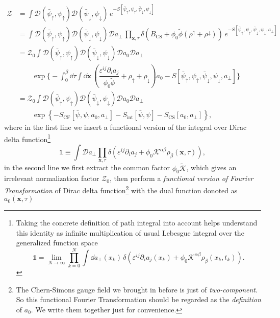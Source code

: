 \documentclass[bachelor,english,numbers]{ustcthesis}
\begin{document}
		\begin{align}
			\mathcal{Z}&=\int \mathcal{D}(\bar{\psi}_\uparrow,\psi_\uparrow)\mathcal{D}(\bar{\psi}_\downarrow,\psi_\downarrow)\,e^{-S[\bar{\psi}_\uparrow,\psi_\uparrow,\bar{\psi}_\downarrow,\psi_\downarrow]}\nonumber\\
			&=\int\mathcal{D}(\bar{\psi}_\uparrow,\psi_\uparrow)\mathcal{D}(\bar{\psi}_\downarrow,\psi_\downarrow)\mathcal{D}a_{\perp}\,\prod_{\bm{x},\tau}\delta\left(B_{\text{CS}}+\phi_0\widetilde{\phi}(\rho^\uparrow+\rho^\downarrow)\right)\,e^{-S[\bar{\psi}_\uparrow,\psi_\uparrow,\bar{\psi}_\downarrow,\psi_\downarrow,a_\perp]}\nonumber\\
			&=\mathcal{Z}_0\int\mathcal{D}(\bar{\psi}_\uparrow,\psi_\uparrow)\mathcal{D}(\bar{\psi}_\downarrow,\psi_\downarrow)\mathcal{D}a_0\mathcal{D}a_{\perp}\nonumber\\
			&\qquad\exp \bigg\{-\int_0^\beta\dd\tau\int\dd\bm{x}\,\left(\dfrac{\varepsilon^{ij}\partial_i a_j}{\phi_0\widetilde{\phi}}+\rho_\uparrow+\rho_\downarrow\right)a_0-S[\bar{\psi}_\uparrow,\psi_\uparrow,\bar{\psi}_\downarrow,\psi_\downarrow,a_\perp]\bigg\}\nonumber\\
			&=\mathcal{Z}_0\int\mathcal{D}(\bar{\psi}_\uparrow,\psi_\uparrow)\mathcal{D}(\bar{\psi}_\downarrow,\psi_\downarrow)\mathcal{D}a_0\mathcal{D}a_{\perp}\nonumber\\
			&\qquad\exp \left\{-S_{\text{CF}}[\bar{\psi},\psi,a_0,a_{\perp}]-S_{\text{int}}[\bar{\psi},\psi]-S_{\text{CS}}[a_0,a_{\perp}]\right\},\label{2.3.1}
		\end{align}
		where in the first line we insert a functional version of the integral over Dirac delta function\footnote{Taking the concrete definition of path integral into account helps understand this identity as infinite multiplication of usual Lebesgue integral over the generalized function space
		\begin{equation*}
			\mathds{1}=\lim_{N\rightarrow \infty}\prod_{k=0}^N\int\dd a_{\perp}(x_k)\,\delta(\varepsilon^{ij} \partial_i a_j(x_k)+\phi_0 \mathcal{K}^{\alpha \beta}\rho_{\beta}(x_k,t_k) ).
		\end{equation*}}
		\begin{equation*}
			\mathds{1}\equiv\int\mathcal{D}a_{\perp}\prod_{\bm{x},\tau}\delta(\varepsilon^{ij}\partial_i a_j+\phi_0\mathcal{K}^{\alpha \beta}\rho_\beta(\bm{x},\tau)),
		\end{equation*}
		in the second line we first extract the common factor $\phi_0\widetilde{\mathcal{K}}$, which gives an irrelevant normalization factor $\mathcal{Z}_0$, then perform a \emph{functional version of Fourier Transformation} of Dirac delta function\footnote{The Chern-Simons gauge field we brought in before is just of \emph{two-component}. So this functional Fourier Transformation should be regarded as the \emph{definition} of $a_0$. We write them together just for convenience.} with the dual function donoted as $a_0(\bm{x},\tau)$
\end{document}
